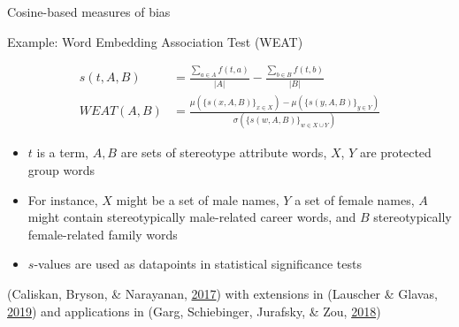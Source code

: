 \documentclass[10pt,ignorenonframetext,x11names, dvipsnames, bibspacing,natbib]{beamer}
\begin{document}
\begin{frame}{Cosine-based measures of bias}
\protect\hypertarget{cosine-based-measures-of-bias-5}{}

\begin{block}{Example: Word Embedding Association Test (WEAT)}

\begin{align*}
s(t,A,B) & = \frac{\sum_{a\in A}f(t,a)}{\vert A\vert} - \frac{\sum_{b\in B}f(t,b)}{\vert B\vert}
\\
WEAT(A,B) & = \frac{
\mu\left(\{s(x,A,B)\}_{x\in X}\right) -\mu\left(\{s(y,A,B)\}_{y\in Y}\right) 
}{
\sigma\left(\{s(w,A,B)\}_{w\in X\cup Y}\right)
}
\end{align*}

\begin{itemize}
\item
  \(t\) is a term, \(A, B\) are sets of stereotype attribute words,
  \(X\), \(Y\) are protected group words
\item
  For instance, \(X\) might be a set of male names, \(Y\) a set of
  female names, \(A\) might contain stereotypically male-related career
  words, and \(B\) stereotypically female-related family words
\item
  \(s\)-values are used as datapoints in statistical significance tests
\end{itemize}

\footnotesize

\vspace{2mm}

(Caliskan, Bryson, \& Narayanan,
\protect\hyperlink{ref-Caliskan2017semanticsBiases}{2017}) with
extensions in (Lauscher \& Glavas,
\protect\hyperlink{ref-Lauscher2019multidimensional}{2019}) and
applications in (Garg, Schiebinger, Jurafsky, \& Zou,
\protect\hyperlink{ref-Garg2018years}{2018})

\end{block}

\end{frame}
\end{document}

